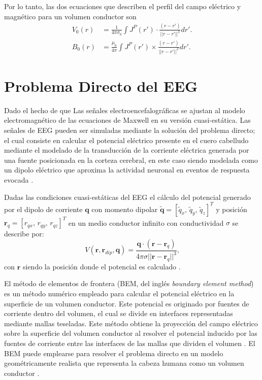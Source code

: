 Por lo tanto, las dos ecuaciones que describen el perfil del campo eléctrico y magnético para un volumen conductor son
\begin{align}
	V_0(r) & = \frac{1}{4\pi\sigma_0} \int J^{P}(r') \cdot \frac{(r - r')}{||r - r'||^3} dr' \text{.} \label{eq:forward1} \\
	B_0(r) & = \frac{\mu_{0}}{4\pi} \int J^{P}(r') \times \frac{(r - r')}{||r - r'||^3} dr' \text{.} \label{eq:forward2}
\end{align}

\section{Problema Directo del EEG}
\label{sec:methodology:direct}

Dado el hecho de que Las señales electroencefalográficas se ajustan al modelo electromagnético de las ecuaciones de Maxwell en su versión cuasi-estática.
Las señales de EEG pueden ser simuladas mediante la solución del problema directo; el cual consiste en calcular el potencial eléctrico presente en el cuero cabelludo mediante el modelado de la transducción de la corriente eléctrica generada por una fuente posicionada en la corteza cerebral, en este caso siendo modelada como un dipolo eléctrico que aproxima la actividad neuronal en eventos de respuesta evocada \cite{Mosher1999, Hallez2007}.

Dadas las condiciones cuasi-estáticas del EEG \cite{Plonsey1967} el cálculo del potencial generado por el dipolo de corriente $\mathbf{q}$ con momento dipolar  $\mathbf{\tilde{q}} = [\tilde{q}_x,\,\tilde{q}_y,\,\tilde{q}_z]^T$ y posición $\mathbf{r}_{q} = [r_{qx},\,r_{qy},\,r_{qz}]^T$ en un medio conductor infinito con conductividad $\sigma$ se describe por: \begin{equation}
	\label{fdip}
	V(\mathbf{r},\mathbf{r}_{dip},\mathbf{q})=\frac{\mathbf{q}\cdot(\mathbf{r}-\mathbf{r}_{q})}{4\pi \sigma {||\mathbf{r}-\mathbf{r}_{q}||}^{3}}\text{,}
\end{equation}
con $\mathbf{r}$ siendo la posición donde el potencial es calculado \cite{Hallez2007}.

El método de elementos de frontera (BEM, del inglés \emph{boundary element method}) es un método numérico empleado para calcular el potencial eléctrico en la superficie de un volumen conductor. Este potencial es originado por fuentes de corriente dentro del volumen, el cual se divide en interfaces representadas mediante mallas teseladas.
Este método obtiene la proyección del campo eléctrico sobre la superficie del volumen conductor al resolver el potencial inducido por las fuentes de corriente entre las interfaces de las mallas que dividen el volumen \cite{Hallez2007}.
El BEM puede emplearse para resolver el problema directo en un modelo geométricamente realista que representa la cabeza humana como un volumen conductor \cite{Ermer2001}.

